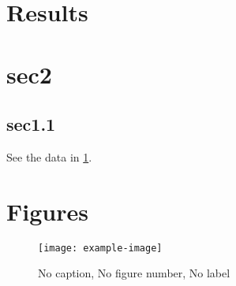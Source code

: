\documentclass{article}
\begin{document}
\clearpage

\section{Results}


\section{sec2}
\subsection{sec1.1}

See the data in \ref{fig:1}.

\section*{Figures}
\begin{figure}
    \texttt{[image: example-image]}
    \caption{No caption, No figure number, No label}
    \label{fig:1}
\end{figure}
\end{document}
